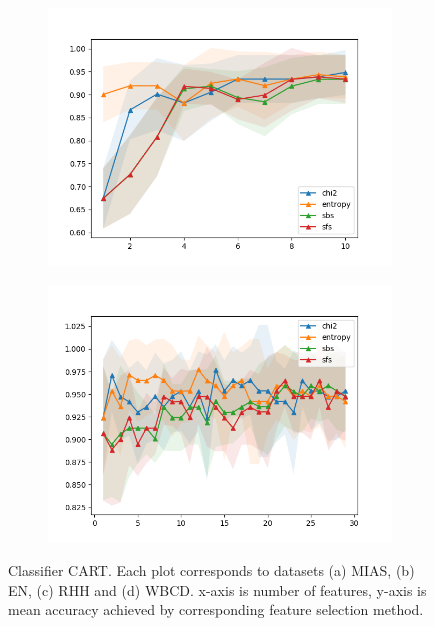\begin{figure}[htbp]
  \begin{subfigure}[b]{0.475\textwidth}
      \centering
      \includegraphics[width=\textwidth]{../plots_with_std_fill/CARTd3.png}
      \caption[]%
      {{\small}}
      \label{fig:CART_RHH}
  \end{subfigure}
  \quad
  \begin{subfigure}[b]{0.475\textwidth}
      \centering
      \includegraphics[width=\textwidth]{../plots_with_std_fill/CARTd4.png}
      \caption[]%
      {{\small}}
      \label{fig:CART_WBCD}
  \end{subfigure}
  \caption[]
  {\small
    Classifier CART. Each plot corresponds to datasets (a) MIAS, (b) EN, (c) RHH and (d) WBCD. x-axis is number of features, y-axis is mean accuracy achieved by corresponding feature selection method.
  }
  \label{fig:plots_CART}
\end{figure}
